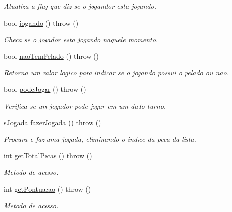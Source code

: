 \begin{DoxyCompactItemize}
\begin{DoxyCompactList}\small\item\em Atualiza a flag que diz se o jogandor esta jogando. \item\end{DoxyCompactList}\item 
bool \hyperlink{classJogador_a0270123a28f581760fab650d9fba95e9}{jogando} ()  throw ()
\begin{DoxyCompactList}\small\item\em Checa se o jogador esta jogando naquele momento. \item\end{DoxyCompactList}\item 
bool \hyperlink{classJogador_a57ea21369a77f6d39d0082d562ac1c28}{naoTemPelado} ()  throw ()
\begin{DoxyCompactList}\small\item\em Retorna um valor logico para indicar se o jogando possui o pelado ou nao. \item\end{DoxyCompactList}\item 
bool \hyperlink{classJogador_a50bda4df4a489933cdaf1fe9daef0c89}{podeJogar} ()  throw ()
\begin{DoxyCompactList}\small\item\em Verifica se um jogador pode jogar em um dado turno. \item\end{DoxyCompactList}\item 
\hyperlink{structsJogada}{sJogada} \hyperlink{classJogador_a591a5832e0204c20740adda8e872e026}{fazerJogada} ()  throw ()
\begin{DoxyCompactList}\small\item\em Procura e faz uma jogada, eliminando o indice da peca da lista. \item\end{DoxyCompactList}\item 
int \hyperlink{classJogador_a507ec2dd2de59c29ce3ce0858ff7e013}{getTotalPecas} ()  throw ()
\begin{DoxyCompactList}\small\item\em Metodo de acesso. \item\end{DoxyCompactList}\item 
int \hyperlink{classJogador_a3aa048567359dfd36094feac3519e567}{getPontuacao} ()  throw ()
\begin{DoxyCompactList}\small\item\em Metodo de acesso. \item\end{DoxyCompactList}\item 

\end{DoxyCompactItemize}
